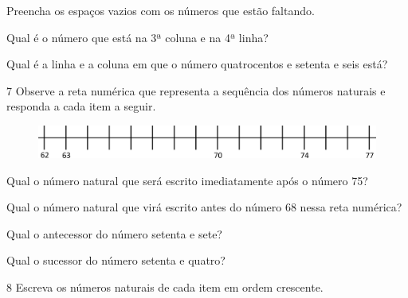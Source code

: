 \begin{escolha}
\item Preencha os espaços vazios com os números que estão faltando.

\item Qual é o número que está na 3ª coluna e na 4ª linha?\\

\item Qual é a linha e a coluna em que o número quatrocentos e setenta e seis está?\\
\end{escolha}

\vspace{-2ex}

\num{7} Observe a reta numérica que representa a sequência dos números naturais e responda a cada item a seguir.

\begin{figure}[htpb!]
\includegraphics[width=\textwidth]{./media/image31.png}
\end{figure}

\begin{escolha}
\item Qual o número natural que será escrito imediatamente após o número 75?\\

\item Qual o número natural que virá escrito antes do número 68 nessa reta numérica?\\

\item Qual o antecessor do número setenta e sete?\\

\item Qual o sucessor do número setenta e quatro?\\
\end{escolha}

\num{8} Escreva os números naturais de cada item em ordem crescente.


